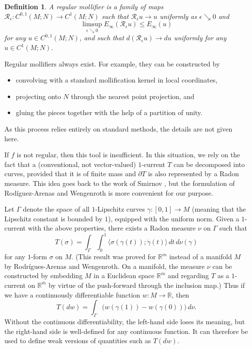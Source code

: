 \documentclass[10pt,a4paper]{amsart}
\newcommand{\R}{\mathbb{R}}
\newcommand{\pairing}[2]{\langle #1; #2 \rangle}
\newtheorem{definition}[theorem]{Definition}
\begin{document}
\begin{definition}
A \emph{regular mollifier} is a family of maps $\mathcal{R}_\epsilon \colon C^{0, 1}(M; N) \to C^1(M; N)$ such that $\mathcal{R}_\epsilon u \to u$ uniformly
as $\epsilon \searrow 0$ and
\[
\limsup_{\epsilon \searrow 0} E_\infty(\mathcal{R}_\epsilon u) \le E_\infty(u)
\]
for any $u \in C^{0, 1}(M; N)$, and such that $d(\mathcal{R_\epsilon} u) \to du$
uniformly for any $u \in C^1(M; N)$.
\end{definition}

Regular mollifiers always exist. For example, they can be constructed by
\begin{itemize}
\item convolving with a standard mollification kernel in local coordinates,
\item projecting onto $N$ through the nearest point projection, and
\item gluing the pieces together with the help of a partition of unity.
\end{itemize}
As this process relies entirely on standard methods, the details are not given here.

If $f$ is not regular, then this tool is insufficient. In this situation,
we rely on the fact that a (conventional, not vector-valued) $1$-current $T$
can be decomposed into curves, provided that it is of finite mass and $\partial T$ is also represented by a Radon measure.
This idea goes back to the work of Smirnov \cite{Smirnov:93}, but the formulation of
Rod\'iguez-Arenas and Wengenroth \cite{Rodriguez-Arenas-Wengenroth:24} is more convenient for our purpose.

Let $\Gamma$ denote the space of all $1$-Lipschitz curves $\gamma \colon [0, 1] \to M$ (meaning that the Lipschitz constant is bounded by $1$), equipped with the uniform norm.
Given a $1$-current with the above properties, there exists a Radon measure $\nu$ on $\Gamma$
such that
\[
T(\sigma) = \int_\Gamma \int_0^1 \pairing{\sigma(\gamma(t))}{\dot{\gamma}(t)} \, dt \, d\nu(\gamma)
\]
for any $1$-form $\sigma$ on $M$.
(This result was proved for $\R^m$ instead of a manifold $M$ by Rodr\'igues-Arenas and Wengenroth. On a manifold, the measure $\nu$ can be constructed
by embedding $M$ in a Euclidean space $\R^{\bar{m}}$ and regarding $T$ as a
$1$-current on $\R^{\bar{m}}$ by virtue of the push-forward through the inclusion map.) Thus if we have a
continuously differentiable function $w \colon M \to \R$, then
\begin{equation} \label{eq:curve-decomposition}
T(dw) = \int_\Gamma \bigl(w(\gamma(1)) - w(\gamma(0))\bigr) \, d\nu.
\end{equation}
Without the continuous differentiability, the left-hand side loses its meaning, but the right-hand side
is well-defined for any continuous function. It can therefore be used to define weak versions of quantities such as $T(dw)$.
\end{document}
